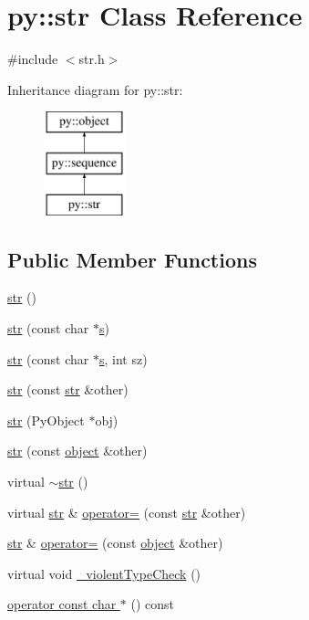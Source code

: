 \hypertarget{classpy_1_1str}{}\section{py\+:\+:str Class Reference}
\label{classpy_1_1str}


{\ttfamily \#include $<$str.\+h$>$}

Inheritance diagram for py\+:\+:str\+:\begin{figure}[H]
\begin{center}
\leavevmode
\includegraphics[height=3.000000cm]{classpy_1_1str}
\end{center}
\end{figure}
\subsection*{Public Member Functions}
\begin{DoxyCompactItemize}
\item 
\hyperlink{classpy_1_1str_a8e88807df2b389e860745241fa879190}{str} ()
\item 
\hyperlink{classpy_1_1str_a30eed59d62dacbb0bf5e2cf305d47503}{str} (const char $\ast$\hyperlink{indexexpr_8h_ae024b0db549122b44c349ae28ec990dc}{s})
\item 
\hyperlink{classpy_1_1str_af0c072b127d86bf8879fd11dc27fbe3a}{str} (const char $\ast$\hyperlink{indexexpr_8h_ae024b0db549122b44c349ae28ec990dc}{s}, int sz)
\item 
\hyperlink{classpy_1_1str_a80a4d9322b69800c2e7cd4377fb83359}{str} (const \hyperlink{classpy_1_1str}{str} \&other)
\item 
\hyperlink{classpy_1_1str_a23f20072b5069a228ba7c69c4bae0081}{str} (Py\+Object $\ast$obj)
\item 
\hyperlink{classpy_1_1str_a55812f02f41a4476f2e5adc71f3a0ca4}{str} (const \hyperlink{classpy_1_1object}{object} \&other)
\item 
virtual \hyperlink{classpy_1_1str_ac495f8ca33195e2305d297723d0ba328}{$\sim$str} ()
\item 
virtual \hyperlink{classpy_1_1str}{str} \& \hyperlink{classpy_1_1str_ae736017f869f9d2f3e9809c76645a311}{operator=} (const \hyperlink{classpy_1_1str}{str} \&other)
\item 
\hyperlink{classpy_1_1str}{str} \& \hyperlink{classpy_1_1str_a34d2c937deb286ec8f34b2704bbfc561}{operator=} (const \hyperlink{classpy_1_1object}{object} \&other)
\item 
virtual void \hyperlink{classpy_1_1str_af08aad8ff03e25d9eef7bc08f13eb896}{\+\_\+violent\+Type\+Check} ()
\item 
\hyperlink{classpy_1_1str_a7953e4da8711184c0880d16b5caf41ee}{operator const char $\ast$} () const 
\end{DoxyCompactItemize}
